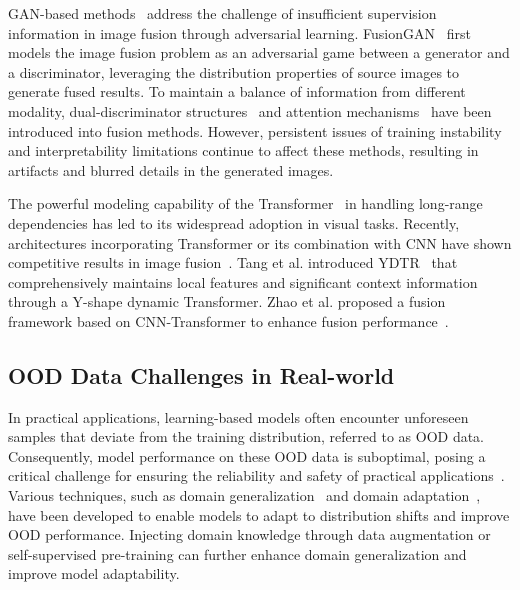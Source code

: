 GAN-based methods~\cite{ma2019fusiongan, fu2021image, liu2022target} address the challenge of insufficient supervision information in image fusion through adversarial learning. FusionGAN~\cite{ma2019fusiongan} first models the image fusion problem as an adversarial game between a generator and a discriminator, leveraging the distribution properties of source images to generate fused results. To maintain a balance of information from different modality, dual-discriminator structures~\cite{xu2019learning, huang2023magan} and attention mechanisms~\cite{li2020attentionfgan} have been introduced into fusion methods. However, persistent issues of training instability and interpretability limitations continue to affect these methods, resulting in artifacts and blurred details in the generated images.

The powerful modeling capability of the Transformer~\cite{vaswani2017attention} in handling long-range dependencies has led to its widespread adoption in visual tasks. Recently, architectures incorporating Transformer or its combination with CNN have shown competitive results in image fusion~\cite{ma2022swinfusion, wang2022swinfuse, tang2022ydtr, tang2023tccfusion, tang2023datfuse, zhao2023cddfuse}.
Tang et al. introduced YDTR~\cite{tang2022ydtr} that comprehensively maintains local features and significant context information through a Y-shape dynamic Transformer.
Zhao et al. proposed a fusion framework based on CNN-Transformer to enhance fusion performance~\cite{zhao2023cddfuse}.

\subsection{OOD Data Challenges in Real-world}
In practical applications, learning-based models often encounter unforeseen samples that deviate from the training distribution, referred to as OOD data. Consequently, model performance on these OOD data is suboptimal, posing a critical challenge for ensuring the reliability and safety of practical applications~\cite{sehwag2019analyzing, pan2023understanding, yang2023reference}. Various techniques, such as domain generalization~\cite{zhou2022domain} and domain adaptation~\cite{ben2010theory, finn2017model}, have been developed to enable models to adapt to distribution shifts and improve OOD performance. Injecting domain knowledge through data augmentation or self-supervised pre-training can further enhance domain generalization and improve model adaptability. 

